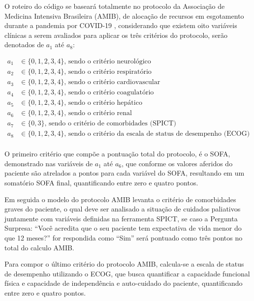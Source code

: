 \documentclass[12pt]{article}
\begin{document}
O roteiro do código se baseará totalmente no protocolo da Associação de Medicina Intensiva Brasileira (AMIB), de alocação de recursos em esgotamento durante a pandemia por COVID-19 \cite{kretzer2020recomendaccoes}, considerando que existem oito variáveis clínicas a serem avaliados para aplicar os três critérios do protocolo, serão denotados de $a_1$ até $a_8$:

\[
    \begin{split}
        a_1 &\in \{0, 1, 2, 3, 4\}\text{, sendo o critério neurológico} \\
        a_2 &\in \{0, 1, 2, 3, 4\}\text{, sendo o critério respiratório} \\
        a_3 &\in \{0, 1, 2, 3, 4\}\text{, sendo o critério cardiovascular} \\
        a_4 &\in \{0, 1, 2, 3, 4\}\text{, sendo o critério coagulatório} \\
        a_5 &\in \{0, 1, 2, 3, 4\}\text{, sendo o critério hepático} \\
        a_6 &\in \{0, 1, 2, 3, 4\}\text{, sendo o critério renal} \\
        a_7 &\in \{0, 3\}\text{, sendo o critério de comorbidades (SPICT) } \\
        a_8 &\in \{0, 1, 2, 3, 4\}\text{, sendo o critério da escala de status de desempenho (ECOG)} \\
    \end{split}
\] 

O primeiro critério que compõe a pontuação total do protocolo, é o SOFA, demonstrado nas variáveis de $a_1$ até $a_6$, que conforme os valores aferidos do paciente são atrelados a pontos para cada variável do SOFA, resultando em um somatório SOFA final, quantificando entre zero e quatro pontos.

Em seguida o modelo do protocolo AMIB levanta o critério de comorbidades graves do paciente, o qual deve ser analisado a situação de cuidados paliativos juntamente com variáveis definidas na ferramenta SPICT, se caso a Pergunta Surpresa: “Você acredita que o seu paciente tem expectativa de vida menor do que 12 meses?” for respondida como “Sim” será pontuado como três pontos no total do calculo AMIB.

Para compor o último critério do protocolo AMIB, calcula-se a escala de status de desempenho utilizando o ECOG, que busca quantificar a capacidade funcional física e capacidade de independência e auto-cuidado do paciente, quantificando entre zero e quatro pontos.
\end{document}
